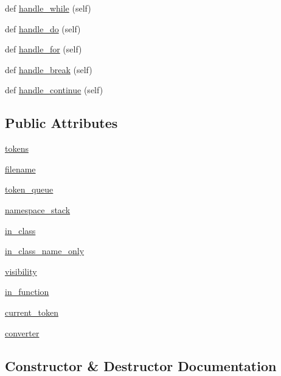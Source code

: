 \begin{DoxyCompactItemize}
\item 
def \hyperlink{classcpp_1_1ast_1_1AstBuilder_aac812e812ba2e5fbd80dde93be01a414}{handle\+\_\+while} (self)
\item 
def \hyperlink{classcpp_1_1ast_1_1AstBuilder_a540226b483513b423d4ec2c4f10b18f5}{handle\+\_\+do} (self)
\item 
def \hyperlink{classcpp_1_1ast_1_1AstBuilder_a0025c4d8ca779d69552e0947665eb1c4}{handle\+\_\+for} (self)
\item 
def \hyperlink{classcpp_1_1ast_1_1AstBuilder_a2b663a3e15e70b9d85bf17afb2bcf07a}{handle\+\_\+break} (self)
\item 
def \hyperlink{classcpp_1_1ast_1_1AstBuilder_a511eb003ed301a713a687e5293584077}{handle\+\_\+continue} (self)
\end{DoxyCompactItemize}
\subsection*{Public Attributes}
\begin{DoxyCompactItemize}
\item 
\hyperlink{classcpp_1_1ast_1_1AstBuilder_a1b21f8bef712e91862ccb6b1147cab0d}{tokens}
\item 
\hyperlink{classcpp_1_1ast_1_1AstBuilder_ad8b8f5788de55d6c7151e82af8b21115}{filename}
\item 
\hyperlink{classcpp_1_1ast_1_1AstBuilder_ae167f12797e7c02c1b60c11c83cdb22f}{token\+\_\+queue}
\item 
\hyperlink{classcpp_1_1ast_1_1AstBuilder_ab183aa48e4b6e116379f95eb3d11039c}{namespace\+\_\+stack}
\item 
\hyperlink{classcpp_1_1ast_1_1AstBuilder_a9edc1e10a3f005b463fd9316d83dd15d}{in\+\_\+class}
\item 
\hyperlink{classcpp_1_1ast_1_1AstBuilder_a376583354ab9afa308b7f34105bf3f4a}{in\+\_\+class\+\_\+name\+\_\+only}
\item 
\hyperlink{classcpp_1_1ast_1_1AstBuilder_a2f16b19846c405101235432d2666b614}{visibility}
\item 
\hyperlink{classcpp_1_1ast_1_1AstBuilder_ad5ac0612dfff44241033864832dbdfe3}{in\+\_\+function}
\item 
\hyperlink{classcpp_1_1ast_1_1AstBuilder_a38579523ccc1ae9d202ac722baea45fc}{current\+\_\+token}
\item 
\hyperlink{classcpp_1_1ast_1_1AstBuilder_ae8551cf0405bc6e367636b1f3b37d083}{converter}
\end{DoxyCompactItemize}


\subsection{Constructor \& Destructor Documentation}
